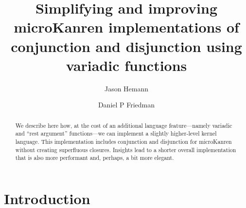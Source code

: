 \documentclass[sigplan,screen,draft,anonymous,review,natbib=false]{acmart}
\begin{document}
\title{Simplifying and improving microKanren implementations of
  conjunction and disjunction using variadic functions}

\author{Jason Hemann}
\author{Daniel P Friedman}

\renewcommand{\shortauthors}{Hemann et al.}

\begin{abstract}
  We describe here how, at the cost of an additional language
  feature---namely variadic and \enquote{rest argument} functions---we
  can implement a slightly higher-level kernel language. This
  implementation includes conjunction and disjunction for microKanren
  without creating superfluous closures. Insights lead to a shorter
  overall implementation that is also more performant and, perhaps, a
  bit more elegant.
\end{abstract}


\keywords{}

\maketitle

\section{Introduction}
\end{document}
